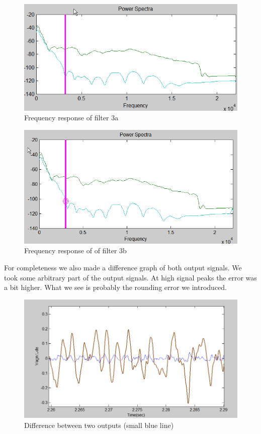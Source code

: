 \documentclass[a4paper,twoside,11pt, fleqn]{article}
\begin{document}
\begin{figure}[h]
	\includegraphics[scale = 0.5]{Images/3a_powerspectra}
    \caption{Frequency response of filter 3a}
\end{figure}

\begin{figure}[h]
	\includegraphics[scale = 0.45]{Images/3b_powerspectra}
    \caption{Frequency response of of filter 3b }
\end{figure}
For completeness we also made a difference graph of both output signals. We took some arbitrary part of the output signals. At high signal peaks the error was a bit higher. What we see is probably the rounding error we introduced.

\begin{figure}[h]
	\includegraphics[scale = 0.55]{Images/3b_difference}
    \caption{Difference between two outputs (small blue line)}
\end{figure}
\end{document}
